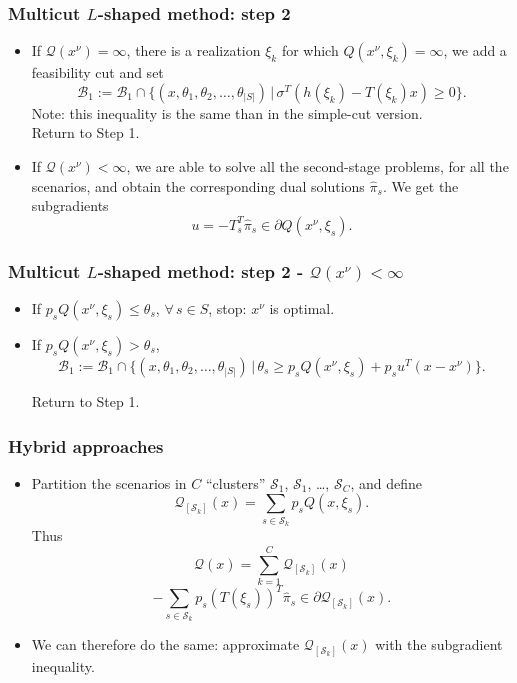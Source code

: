 \documentclass{beamer}
\begin{document}
\begin{frame}
\frametitle{Multicut $L$-shaped method: step 2}
	
\begin{itemize}
\item
If $\mathcal{Q}(x^{\nu}) = \infty$, there is a realization $\xi_k$ for which $Q(x^{\nu}, \xi_k) = \infty$, we add a feasibility cut and set
\[
\mathcal{B}_1 := \mathcal{B}_1 \cap \lbrace
(x,\theta_1,\theta_2,\ldots,\theta_{|S|}) \,|\, \sigma^T(h(\xi_k) -
T(\xi_k)x) \geq 0\rbrace.
\]
Note: this inequality is the same than in the simple-cut version.\\
Return to Step 1.
\item
If $\mathcal{Q}(x^{\nu}) < \infty$, we are able to solve all the second-stage problems, for all the scenarios, and obtain the corresponding dual solutions $\hat{\pi}_s$.
We get the subgradients
\[
u = -T_s^T\hat{\pi}_s \in \partial Q(x^{\nu}, \xi_s).
\]
\end{itemize}
	
\end{frame}

\begin{frame}
\frametitle{Multicut $L$-shaped method: step 2 - $\mathcal{Q}(x^{\nu}) < \infty$}
	
\begin{itemize}
\item
If $p_s Q(x^{\nu}, \xi_s) \leq \theta_s$, $\forall\, s \in S$, stop: $x^{\nu}$ is optimal.
\item
If $p_s Q(x^{\nu}, \xi_s) > \theta_s$,
\[
\mathcal{B}_1 := \mathcal{B}_1 \cap \lbrace (x,\theta_1,\theta_2,\ldots,\theta_{|S|}) \,|\,
\theta_s \geq p_s Q(x^{\nu}, \xi_s) + p_s u^T(x-x^{\nu})\rbrace.
\]
		
Return to Step 1.
\end{itemize}
	
\end{frame}

\begin{frame}
\frametitle{Hybrid approaches}

\begin{itemize}
	\item
	Partition the scenarios in $C$ ``clusters'' $\mathcal{S}_1$,
	$\mathcal{S}_1$, \ldots, $\mathcal{S}_C$, and define
	\[
	\mathcal{Q}_{[\mathcal{S}_k]}(x) = \sum_{s \in \mathcal{S}_k} p_s Q(x, \xi_s).
	\]
	Thus
	\[
	\mathcal{Q}(x) = \sum_{k = 1}^C \mathcal{Q}_{[\mathcal{S}_k]}(x)
	\]
	\[
	-\sum_{s \in \mathcal{S}_k} p_s(T(\xi_s))^T\hat{\pi}_s
	\in \partial \mathcal{Q}_{[\mathcal{S}_k]}(x).
	\]
	\item
	We can therefore do the same: approximate $\mathcal{Q}_{[\mathcal{S}_k]}(x)$ with the subgradient inequality.
\end{itemize}

\end{frame}
\end{document}
